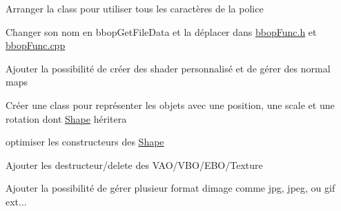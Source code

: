 
\begin{DoxyRefList}
\item[Member \mbox{\hyperlink{classFont_a41a7dca42ac0df85a27163dc9ace9de3}{Font\+::Font}} (int glyph\+Size, const char $\ast$ttf\+Path)]\label{todo__todo000002}%
%
Arranger la class pour utiliser tous les caractères de la police  
\item[Member \mbox{\hyperlink{bbopGlobal_8cpp_abad8b4d4b0f318cf85947bef83f84526}{get\+File\+Data}} (const char $\ast$filename)]\label{todo__todo000001}%
%
Changer son nom en bbop\+Get\+File\+Data et la déplacer dans \mbox{\hyperlink{bbopFunc_8h}{bbop\+Func.\+h}} et \mbox{\hyperlink{bbopFunc_8cpp}{bbop\+Func.\+cpp}}  
\item[Class \mbox{\hyperlink{classScene}{Scene}} ]\label{todo__todo000003}%
%
Ajouter la possibilité de créer des shader personnalisé et de gérer des normal maps  
\item[Class \mbox{\hyperlink{classShape}{Shape}} ]\label{todo__todo000004}%
%
Créer une class pour représenter les objets avec une position, une scale et une rotation dont \mbox{\hyperlink{classShape}{Shape}} héritera 

optimiser les constructeurs des \mbox{\hyperlink{classShape}{Shape}} 

Ajouter les destructeur/delete des VAO/\+VBO/\+EBO/\+Texture  
\item[Class \mbox{\hyperlink{classTexture}{Texture}} ]\label{todo__todo000005}%
%
Ajouter la possibilité de gérer plusieur format d\textquotesingle{}image comme jpg, jpeg, ou gif ext... 
\end{DoxyRefList}
